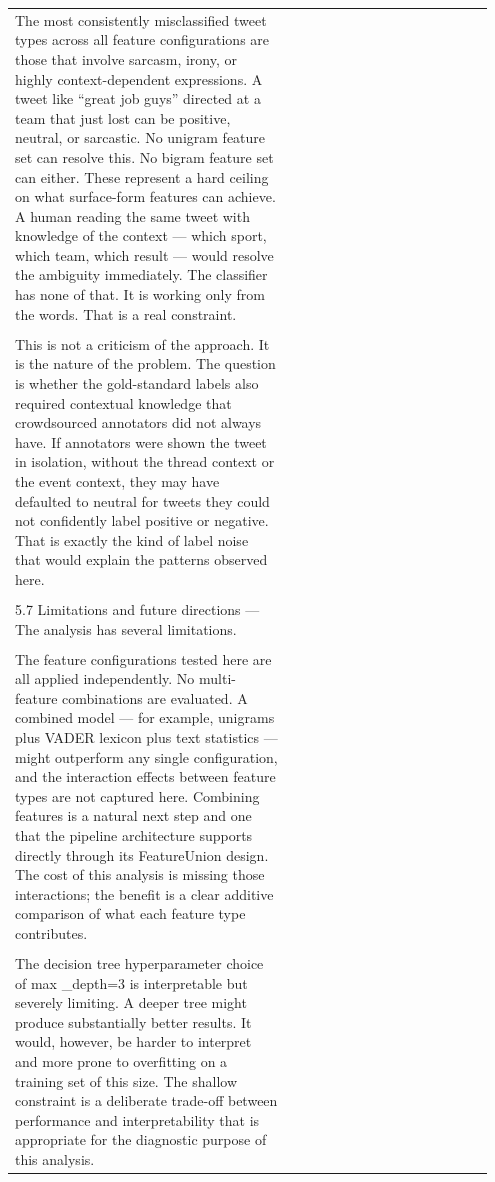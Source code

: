 \documentclass[11pt]{article}
\begin{document}
\begin{longtable}{|p{0.55\linewidth}|p{0.40\linewidth}|}
\hline
\rule{0pt}{3.5cm} & \\
\hline
The most consistently misclassified tweet types across all feature configurations are those that involve sarcasm, irony, or highly context-dependent expressions. A tweet like ``great job guys'' directed at a team that just lost can be positive, neutral, or sarcastic. No unigram feature set can resolve this. No bigram feature set can either. These represent a hard ceiling on what surface-form features can achieve. A human reading the same tweet with knowledge of the context --- which sport, which team, which result --- would resolve the ambiguity immediately. The classifier has none of that. It is working only from the words. That is a real constraint. & \\[2pt]
\hline
\rule{0pt}{3.5cm} & \\
\hline
This is not a criticism of the approach. It is the nature of the problem. The question is whether the gold-standard labels also required contextual knowledge that crowdsourced annotators did not always have. If annotators were shown the tweet in isolation, without the thread context or the event context, they may have defaulted to neutral for tweets they could not confidently label positive or negative. That is exactly the kind of label noise that would explain the patterns observed here. & \\[2pt]
\hline
\rule{0pt}{3.5cm} & \\
\hline
5.7 Limitations and future directions --- The analysis has several limitations. & \\[2pt]
\hline
\rule{0pt}{3.5cm} & \\
\hline
The feature configurations tested here are all applied independently. No multi-feature combinations are evaluated. A combined model --- for example, unigrams plus VADER lexicon plus text statistics --- might outperform any single configuration, and the interaction effects between feature types are not captured here. Combining features is a natural next step and one that the pipeline architecture supports directly through its FeatureUnion design. The cost of this analysis is missing those interactions; the benefit is a clear additive comparison of what each feature type contributes. & \\[2pt]
\hline
\rule{0pt}{3.5cm} & \\
\hline
The decision tree hyperparameter choice of max \_depth=3 is interpretable but severely limiting. A deeper tree might produce substantially better results. It would, however, be harder to interpret and more prone to overfitting on a training set of this size. The shallow constraint is a deliberate trade-off between performance and interpretability that is appropriate for the diagnostic purpose of this analysis. & \\[2pt]

\end{longtable}
\end{document}
